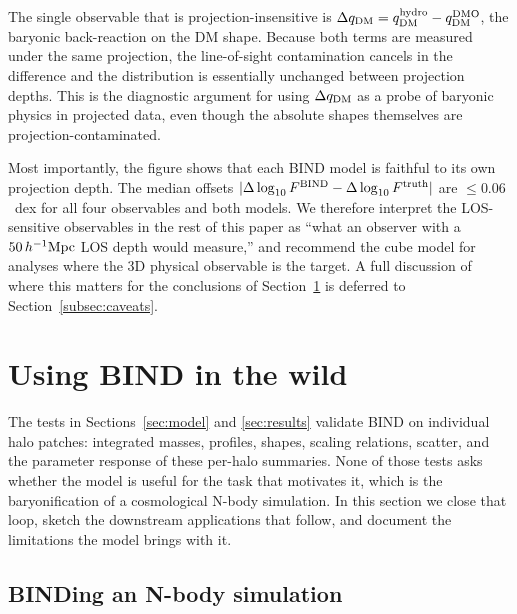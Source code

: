 \documentclass[linenumbers,trackchanges, twocolumn]{aastex701}
\begin{document}
The single observable that is projection-insensitive is $\Delta q_{\rm DM} = q_{\rm DM}^{\rm hydro} - q_{\rm DM}^{\rm DMO}$, the baryonic back-reaction on the DM shape. Because both terms are measured under the same projection, the line-of-sight contamination cancels in the difference and the distribution is essentially unchanged between projection depths. This is the diagnostic argument for using $\Delta q_{\rm DM}$ as a probe of baryonic physics in projected data, even though the absolute shapes themselves are projection-contaminated.

Most importantly, the figure shows that each \textsc{BIND} model is faithful to its own projection depth. The median offsets $|\Delta\log_{10}F^{\rm BIND} - \Delta\log_{10}F^{\rm truth}|$ are $\leq 0.06$~dex for all four observables and both models. We therefore interpret the LOS-sensitive observables in the rest of this paper as ``what an observer with a $50\,h^{-1}{\rm Mpc}$ LOS depth would measure,'' and recommend the cube model for analyses where the 3D physical observable is the target. A full discussion of where this matters for the conclusions of Section~\ref{sec:wild} is deferred to Section~\ref{subsec:caveats}.

\section{Using BIND in the wild}
\label{sec:wild}

The tests in Sections~\ref{sec:model} and \ref{sec:results} validate \textsc{BIND} on individual halo patches: integrated masses, profiles, shapes, scaling relations, scatter, and the parameter response of these per-halo summaries. None of those tests asks whether the model is useful for the task that motivates it, which is the baryonification of a cosmological N-body simulation. In this section we close that loop, sketch the downstream applications that follow, and document the limitations the model brings with it.

\subsection{BINDing an N-body simulation}
\label{subsec:binding}
\end{document}
